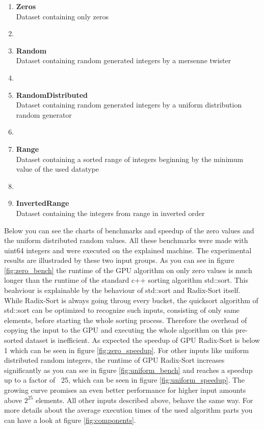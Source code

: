 \documentclass{llncs}
\begin{document}
\begin{enumerate}
  \item \textbf{Zeros}\\ Dataset containing only zeros
  \item[]
  \item \textbf{Random}\\ Dataset containing random generated integers by a mersenne twister
  \item[]
  \item \textbf{RandomDistributed}\\  Dataset containing random generated integers by a uniform distribution random generator
  \item[]
  \item \textbf{Range}\\ Dataset containing a sorted range of integers beginning by the minimum value of the used datatype
  \item[]
  \item \textbf{InvertedRange}\\ Dataset containing the integers from range in inverted order
\end{enumerate}

Below you can see the charts of benchmarks and speedup of the zero values and the uniform distributed random values. All these benchmarks were made with uint64 integers and were executed on the explained machine. The experimental results are illustraded by these two input groups. As you can see in figure \ref{fig:zero_bench} the runtime of the GPU algorithm on only zero values is much longer than the runtime of the standard c++ sorting algorithm std::sort. This beahviour is explainable by the behaviour of std::sort and Radix-Sort itself. While Radix-Sort is always going throug every bucket, the quicksort algorithm of std::sort can be optimized to recognize such inputs, consisting of only same elements, before starting the whole sorting process. Therefore the overhead of copying the input to the GPU and executing the whole algorithm on this pre-sorted dataset is inefficient. As expected the speedup of GPU Radix-Sort is below 1 which can be seen in figure \ref{fig:zero_speedup}. For other inputs like uniform distributed random integers, the runtime of GPU Radix-Sort increases significantly as you can see in figure \ref{fig:uniform_bench} and reaches a speedup up to a factor of ~25, which can be seen in figure \ref{fig:uniform_speedup}. The growing curve promises an even better performance for higher input amounts above $2^{25}$ elements. All other inputs described above, behave the same way. For more details about the average execution times of the used algorithm parts you can have a look at figure \ref{fig:components}.
\end{document}
